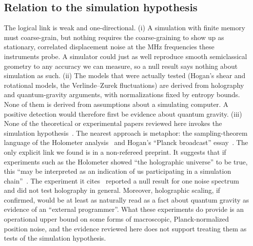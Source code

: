 \subsection{Relation to the simulation hypothesis}

The logical link is weak and one-directional. (i) A simulation with finite
memory must coarse-grain, but nothing requires the coarse-graining to show up as
stationary, correlated displacement noise at the MHz frequencies these
instruments probe. A simulator could just as well reproduce smooth semiclassical
geometry to any accuracy we can measure, so a null result says nothing about
simulation as such. (ii) The models that were actually tested (Hogan's shear and
rotational models, the Verlinde--Zurek fluctuations) are derived from holography
and quantum-gravity arguments, with normalizations fixed by entropy bounds. None
of them is derived from assumptions about a simulating computer. A positive
detection would therefore first be evidence about quantum gravity. (iii) None of
the theoretical or experimental papers reviewed here invokes the simulation
hypothesis~\cite{Hogan2008measurement,Hogan2012interferometers,Chou2016first,Chou2017interferometric,Richardson2021interferometric,Verlinde2021observational,Vermeulen2025photon,Patra2025broadband}.
The nearest approach is metaphor: the sampling-theorem language of the Holometer
analysis~\cite{Chou2016first} and Hogan's ``Planck broadcast''
essay~\cite{Hogan2013now}. The only explicit link we found is in a non-refereed
preprint. It suggests that if experiments such as the Holometer showed ``the
holographic universe'' to be true, this ``may be interpreted as an indication of
us participating in a simulation chain''~\cite{Neukart2022do}. The experiment it
cites~\cite{Chou2016first} reported a null result for one noise spectrum and
did not test holography in general. Moreover, holographic scaling, if confirmed,
would be at least as naturally read as a fact about quantum gravity as evidence
of an ``external programmer''. What these experiments do provide is an
operational upper bound on some forms of macroscopic, Planck-normalized position
noise, and the evidence reviewed here does not support treating them as tests of
the simulation hypothesis.
